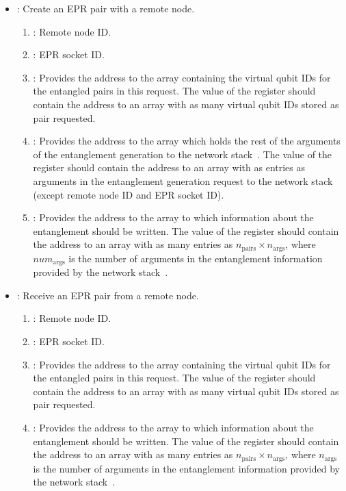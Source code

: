 \begin{itemize}
  \item {}: Create an EPR pair with a remote node.
        \begin{enumerate}
          \item \REGISTER: Remote node ID.
          \item \REGISTER: EPR socket ID.
          \item \REGISTER: Provides the address to the array containing the virtual qubit IDs for the entangled pairs in this request.
                The value of the register should contain the address to an array with as many virtual qubit IDs stored as pair requested.
          \item \REGISTER: Provides the address to the array which holds the rest of the arguments of the entanglement generation to the network stack~\cite{dahlberg2019linklayer,kozlowski2020networklayer}.
                The value of the register should contain the address to an array with as entries as arguments in the entanglement generation request to the network stack~\cite{dahlberg2019linklayer,kozlowski2020networklayer} (except remote node ID and EPR socket ID).
          \item \REGISTER: Provides the address to the array to which information about the entanglement should be written.
                The value of the register should contain the address to an array with as many entries as $n_\mathrm{pairs} \times n_\mathrm{args}$, where $num_\mathrm{args}$ is the number of arguments in the entanglement information provided by the network stack~\cite{dahlberg2019linklayer,kozlowski2020networklayer}.
        \end{enumerate}
  \item {}: Receive an EPR pair from a remote node.
        \begin{enumerate}
          \item \REGISTER: Remote node ID.
          \item \REGISTER: EPR socket ID.
          \item \REGISTER: Provides the address to the array containing the virtual qubit IDs for the entangled pairs in this request.
                The value of the register should contain the address to an array with as many virtual qubit IDs stored as pair requested.
          \item \REGISTER: Provides the address to the array to which information about the entanglement should be written.
                The value of the register should contain the address to an array with as many entries as $n_\mathrm{pairs} \times n_\mathrm{args}$, where $n_\mathrm{args}$ is the number of arguments in the entanglement information provided by the network stack~\cite{dahlberg2019linklayer,kozlowski2020networklayer}.
        \end{enumerate}
\end{itemize}

